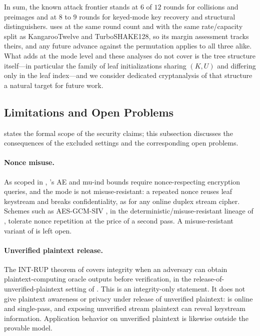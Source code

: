 In sum, the known attack frontier stands at $6$ of $12$ rounds for collisions
and preimages and at $8$ to $9$ rounds for keyed-mode key recovery and
structural distinguishers. \TW{} uses \Keccakp{} at the same round count and
with the same rate/capacity split as KangarooTwelve and TurboSHAKE128, so its
margin assessment tracks theirs, and any future advance against the
permutation applies to all three alike. What \TW{} adds at the mode level and
these analyses do not cover is the tree structure itself---in particular the
family of leaf initializations sharing $(K, U)$ and differing only in the
leaf index---and we consider dedicated cryptanalysis of that structure a
natural target for future work.

\subsection{Limitations and Open Problems}
\label{sec:limitations}

 states the formal scope of the security claims; this
subsection discusses the consequences of the excluded settings and the
corresponding open problems.

\paragraph{Nonce misuse.}
As scoped in , \TW{}'s AE and mu-ind bounds require
nonce-respecting encryption queries, and the mode is not misuse-resistant: a
repeated nonce reuses leaf keystream and breaks confidentiality, as for any
online duplex stream cipher. Schemes such as AES-GCM-SIV \cite{GLL17}, in the
deterministic/misuse-resistant lineage of \cite{RS06}, tolerate nonce
repetition at the price of a second pass. A misuse-resistant variant of \TW{}
is left open.

\paragraph{Unverified plaintext release.}
The \textsf{INT-RUP} theorem of  covers integrity when an
adversary can obtain plaintext-computing oracle outputs before verification, in
the release-of-unverified-plaintext setting of \cite{ABLMMY14}. This is an
integrity-only statement. It does not give plaintext awareness or privacy under
release of unverified plaintext: \TW{} is online and single-pass, and exposing
unverified stream plaintext can reveal keystream information. Application
behavior on unverified plaintext is likewise outside the provable model.

